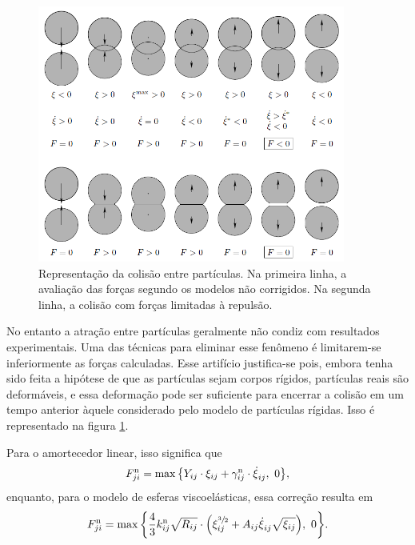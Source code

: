 \begin{figure}[h]
	\caption{Representação da colisão entre partículas. Na primeira linha, a avaliação das forças segundo os modelos não corrigidos. Na segunda linha, a colisão com forças limitadas à repulsão.}
	\begin{center}
		\includegraphics[width=0.9\textwidth]{images/mathematical_model/particle_attraction.PNG}
	\end{center}
	\label{fig:particle_attraction}
\end{figure}

No entanto a atração entre partículas geralmente não condiz com resultados experimentais. Uma das técnicas para eliminar esse fenômeno é limitarem-se inferiormente as forças calculadas. Esse artifício justifica-se pois, embora tenha sido feita a hipótese de que as partículas sejam corpos rígidos, partículas reais são deformáveis, e essa deformação pode ser suficiente para encerrar a colisão em um tempo anterior àquele considerado pelo modelo de partículas rígidas. Isso é representado na figura \ref{fig:particle_attraction}.

Para o amortecedor linear, isso significa que
\begin{equation*}
	\normalForceScalarji = \max\Bqty{\elasticModulusij\cdot\overlapij + \normalDampingConstantij\cdot\overlapDerivativeij, \,\, 0},
\end{equation*}
enquanto, para o modelo de esferas viscoelásticas, essa correção resulta em
\begin{equation*}
	\normalForceScalarji = \max\Bqty{\dfrac{4}{3}\effectiveNormalElasticij\sqrt{\effectiveRadiusij}\cdot\pqty{
		\overlapij^{\sfrac{3}{2}} + \normalDissipativeConstantij\overlapDerivativeij\sqrt{\overlapij}
	}, \,\, 0}.
\end{equation*}


